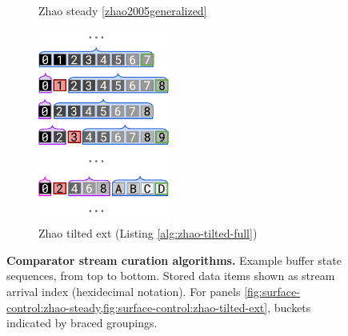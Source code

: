 \begin{figure}
\begin{subfigure}{0.25\linewidth}
\caption{Zhao steady \ref{zhao2005generalized}}
\label{fig:surface-control:zhao-steady}
\end{subfigure}%
\begin{subfigure}{0.25\linewidth}
\centering
\includegraphics[height=2.5in]{img/surface-control-zhao-tilted-ext}
\caption{Zhao tilted ext (Listing \ref{alg:zhao-tilted-full})}
\label{fig:surface-control:zhao-tilted-ext}
\end{subfigure}%

\caption{%
\textbf{Comparator stream curation algorithms.}
\footnotesize
Example buffer state sequences, from top to bottom.
Stored data items shown as stream arrival index (hexidecimal notation).
For panels \cref{fig:surface-control:zhao-steady,fig:surface-control:zhao-tilted-ext}, buckets indicated by braced groupings.
}
\label{fig:surface-control}

\end{figure}
